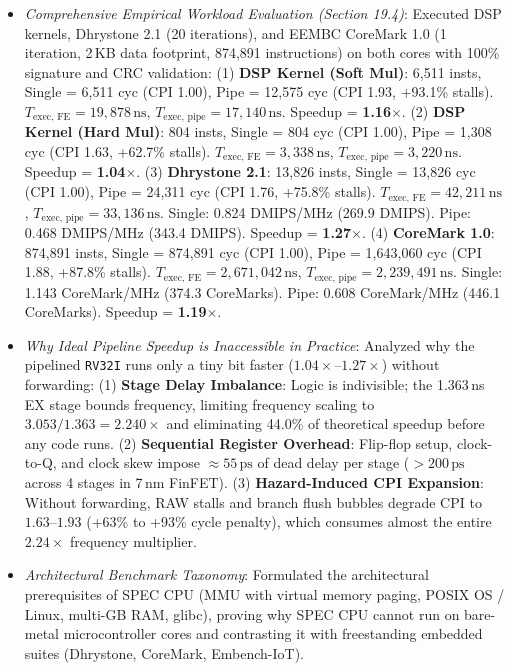 \begin{itemize}
\begin{itemize}
        \item \textit{Comprehensive Empirical Workload Evaluation (Section 19.4)}: Executed DSP kernels, Dhrystone 2.1 (20 iterations), and EEMBC CoreMark 1.0 (1 iteration, 2\,KB data footprint, 874,891 instructions) on both cores with 100\% signature and CRC validation:
        (1) \textbf{DSP Kernel (Soft Mul)}: 6,511 insts, Single = 6,511 cyc (CPI 1.00), Pipe = 12,575 cyc (CPI 1.93, +93.1\% stalls). $T_{\text{exec, FE}} = 19,878\,\text{ns}$, $T_{\text{exec, pipe}} = 17,140\,\text{ns}$. Speedup = \textbf{1.16$\times$}.
        (2) \textbf{DSP Kernel (Hard Mul)}: 804 insts, Single = 804 cyc (CPI 1.00), Pipe = 1,308 cyc (CPI 1.63, +62.7\% stalls). $T_{\text{exec, FE}} = 3,338\,\text{ns}$, $T_{\text{exec, pipe}} = 3,220\,\text{ns}$. Speedup = \textbf{1.04$\times$}.
        (3) \textbf{Dhrystone 2.1}: 13,826 insts, Single = 13,826 cyc (CPI 1.00), Pipe = 24,311 cyc (CPI 1.76, +75.8\% stalls). $T_{\text{exec, FE}} = 42,211\,\text{ns}$, $T_{\text{exec, pipe}} = 33,136\,\text{ns}$. Single: 0.824 DMIPS/MHz (269.9 DMIPS). Pipe: 0.468 DMIPS/MHz (343.4 DMIPS). Speedup = \textbf{1.27$\times$}.
        (4) \textbf{CoreMark 1.0}: 874,891 insts, Single = 874,891 cyc (CPI 1.00), Pipe = 1,643,060 cyc (CPI 1.88, +87.8\% stalls). $T_{\text{exec, FE}} = 2,671,042\,\text{ns}$, $T_{\text{exec, pipe}} = 2,239,491\,\text{ns}$. Single: 1.143 CoreMark/MHz (374.3 CoreMarks). Pipe: 0.608 CoreMark/MHz (446.1 CoreMarks). Speedup = \textbf{1.19$\times$}.
        \item \textit{Why Ideal Pipeline Speedup is Inaccessible in Practice}: Analyzed why the pipelined \texttt{RV32I} runs only a tiny bit faster ($1.04\times\text{--}1.27\times$) without forwarding:
        (1) \textbf{Stage Delay Imbalance}: Logic is indivisible; the 1.363\,ns EX stage bounds frequency, limiting frequency scaling to $3.053 / 1.363 = 2.240\times$ and eliminating 44.0\% of theoretical speedup before any code runs.
        (2) \textbf{Sequential Register Overhead}: Flip-flop setup, clock-to-Q, and clock skew impose $\approx 55\,\text{ps}$ of dead delay per stage ($>200\,\text{ps}$ across 4 stages in 7\,nm FinFET).
        (3) \textbf{Hazard-Induced CPI Expansion}: Without forwarding, RAW stalls and branch flush bubbles degrade CPI to $1.63\text{--}1.93$ (+63\% to +93\% cycle penalty), which consumes almost the entire $2.24\times$ frequency multiplier.
        \item \textit{Architectural Benchmark Taxonomy}: Formulated the architectural prerequisites of SPEC CPU (MMU with virtual memory paging, POSIX OS / Linux, multi-GB RAM, glibc), proving why SPEC CPU cannot run on bare-metal microcontroller cores and contrasting it with freestanding embedded suites (Dhrystone, CoreMark, Embench-IoT).

\end{itemize}
\end{itemize}
